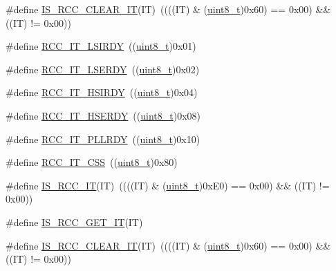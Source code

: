 \begin{DoxyCompactItemize}
\item 
\#define \hyperlink{group___r_c_c___interrupt__source_ga8374741e47d696accd1a72647650ba63}{I\+S\+\_\+\+R\+C\+C\+\_\+\+C\+L\+E\+A\+R\+\_\+\+IT}(IT)~((((IT) \& (\hyperlink{_p_e___types_8h_aba7bc1797add20fe3efdf37ced1182c5}{uint8\+\_\+t})0x60) == 0x00) \&\& ((\+I\+T) != 0x00))
\item 
\#define \hyperlink{group___r_c_c___interrupt__source_ga2b4ef277c1b71f96e0bef4b9a72fca94}{R\+C\+C\+\_\+\+I\+T\+\_\+\+L\+S\+I\+R\+DY}~((\hyperlink{_p_e___types_8h_aba7bc1797add20fe3efdf37ced1182c5}{uint8\+\_\+t})0x01)
\item 
\#define \hyperlink{group___r_c_c___interrupt__source_gad6b6e78a426850f595ef180d292a673d}{R\+C\+C\+\_\+\+I\+T\+\_\+\+L\+S\+E\+R\+DY}~((\hyperlink{_p_e___types_8h_aba7bc1797add20fe3efdf37ced1182c5}{uint8\+\_\+t})0x02)
\item 
\#define \hyperlink{group___r_c_c___interrupt__source_ga69637e51b71f73f519c8c0a0613d042f}{R\+C\+C\+\_\+\+I\+T\+\_\+\+H\+S\+I\+R\+DY}~((\hyperlink{_p_e___types_8h_aba7bc1797add20fe3efdf37ced1182c5}{uint8\+\_\+t})0x04)
\item 
\#define \hyperlink{group___r_c_c___interrupt__source_gad13eaede352bca59611e6cae68665866}{R\+C\+C\+\_\+\+I\+T\+\_\+\+H\+S\+E\+R\+DY}~((\hyperlink{_p_e___types_8h_aba7bc1797add20fe3efdf37ced1182c5}{uint8\+\_\+t})0x08)
\item 
\#define \hyperlink{group___r_c_c___interrupt__source_ga68d48e7811fb58f2649dce6cf0d823d9}{R\+C\+C\+\_\+\+I\+T\+\_\+\+P\+L\+L\+R\+DY}~((\hyperlink{_p_e___types_8h_aba7bc1797add20fe3efdf37ced1182c5}{uint8\+\_\+t})0x10)
\item 
\#define \hyperlink{group___r_c_c___interrupt__source_ga9bb34a4912d2084dc1c0834eb53aa7a3}{R\+C\+C\+\_\+\+I\+T\+\_\+\+C\+SS}~((\hyperlink{_p_e___types_8h_aba7bc1797add20fe3efdf37ced1182c5}{uint8\+\_\+t})0x80)
\item 
\#define \hyperlink{group___r_c_c___interrupt__source_ga710d72ccf88ddbec09b033c81a571a83}{I\+S\+\_\+\+R\+C\+C\+\_\+\+IT}(IT)~((((IT) \& (\hyperlink{_p_e___types_8h_aba7bc1797add20fe3efdf37ced1182c5}{uint8\+\_\+t})0x\+E0) == 0x00) \&\& ((\+I\+T) != 0x00))
\item 
\#define \hyperlink{group___r_c_c___interrupt__source_ga7a1b771d6d9c2d8346ab58a1f046f6a6}{I\+S\+\_\+\+R\+C\+C\+\_\+\+G\+E\+T\+\_\+\+IT}(IT)
\item 
\#define \hyperlink{group___r_c_c___interrupt__source_ga8374741e47d696accd1a72647650ba63}{I\+S\+\_\+\+R\+C\+C\+\_\+\+C\+L\+E\+A\+R\+\_\+\+IT}(IT)~((((IT) \& (\hyperlink{_p_e___types_8h_aba7bc1797add20fe3efdf37ced1182c5}{uint8\+\_\+t})0x60) == 0x00) \&\& ((\+I\+T) != 0x00))
\end{DoxyCompactItemize}


